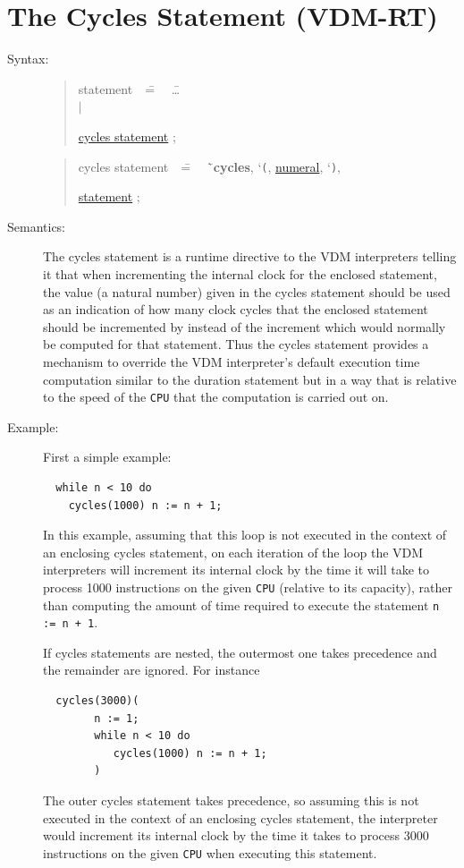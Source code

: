 \documentclass{overturerepchap}
\newcommand{\Lit}[1]{`{\tt #1}\Quote}
\newcommand{\Rule}[2]{
  \begin{quote}\begin{tabbing}
    #1\index{#1}\ \ \= = \ \ \= #2  ; %
    
  \end{tabbing}\end{quote}
  }
\newcommand{\Ruleref}[1]{
  \hyperlink{rule:#1}{#1}}
\newcommand{\dsep}{\\ \> $|$ \>}
\newcommand{\Lop}[1]{`{\bf\ttfamily #1}\Quote}
\begin{document}
\section{The Cycles Statement (VDM-RT)}

\begin{description}
\item[Syntax:]
  \Rule{statement}{
    \ldots \dsep
    \Ruleref{cycles statement}
  }
  \Rule{cycles statement}{
    \Lop{cycles}, \Lit{(}, \Ruleref{numeral}, \Lit{)},
    \Ruleref{statement}
  }

\item[Semantics:]
The cycles statement is a runtime directive to the VDM interpreters
telling it that when incrementing the internal clock for the enclosed
statement, the value (a natural number)
given in the cycles statement should be used as
an indication of how many clock cycles that the enclosed statement
should be incremented by instead of the increment which would normally
be computed for that statement. Thus the cycles statement provides a
mechanism to override the VDM interpreter's default execution time
computation similar to the duration statement but in a way that is
relative to the speed of the \texttt{CPU} that the computation is carried
out on.

\item[Example:] First a simple example:
\begin{lstlisting}
  while n < 10 do
    cycles(1000) n := n + 1; 
\end{lstlisting}
In this example, assuming that this loop is not executed in the
context of an enclosing cycles statement, on each iteration of the
loop the VDM interpreters will increment its internal clock by the time it will
take to process 1000 instructions on the given \texttt{CPU} (relative
to its capacity), rather than computing the amount of time required to
execute the statement \texttt{n := n + 1}. 

If cycles statements are nested, the outermost one takes precedence
and the remainder are ignored. For instance
\begin{lstlisting}
  cycles(3000)(
        n := 1;
        while n < 10 do
           cycles(1000) n := n + 1; 
        )
\end{lstlisting}
The outer cycles statement takes precedence, so assuming this is not
executed in the context of an enclosing cycles statement, the
interpreter would increment its internal clock by the time it takes to
process 3000 instructions on the given \texttt{CPU} when
executing this statement.


\end{description}
\end{document}

